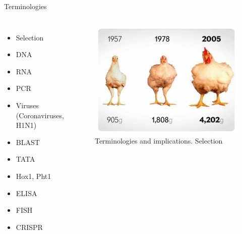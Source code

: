 \documentclass[11pt,ignorenonframetext,aspectratio=169]{beamer}
\begin{document}
\begin{frame}{Terminologies}
\protect\hypertarget{terminologies}{}
\begin{columns}[T,onlytextwidth]
  

\begin{itemize}
\item Selection
\item DNA
\item RNA
\item PCR
\item Viruses (Coronaviruses, H1N1)
\item BLAST
\item TATA
\item Hox1, Pht1
\item ELISA
\item FISH
\item CRISPR
\end{itemize}


\begin{figure}
\includegraphics[width=0.8\linewidth]{../images/chicken_selection} \caption{Terminologies and implications. Selection}\label{fig:terminologies-1}
\end{figure}

\end{columns}
\end{frame}
\end{document}
